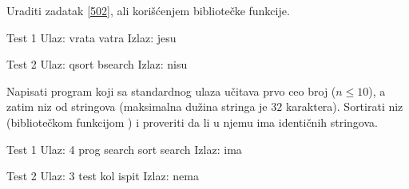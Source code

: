 \begin{Exercise}[label=522]
  Uraditi zadatak \ref{502}, ali korišćenjem bibliotečke 
  funkcije.
  
\begin{minitest}
\begin{test}{Test 1}
Ulaz:   vrata vatra
Izlaz:  jesu
\end{test}
\end{minitest}
\begin{miditest}
\begin{test}{Test 2}
Ulaz:   qsort bsearch
Izlaz:  nisu
\end{test}
\end{miditest}
  
\end{Exercise}

\begin{Exercise}[label=523]
  Napisati program koji sa standardnog ulaza učitava prvo ceo broj
   ($n \leq 10$), a zatim niz  od  stringova
  (maksimalna dužina stringa je $32$ karaktera). Sortirati niz
   (bibliotečkom funkcijom ) i proveriti da li u
  njemu ima identičnih stringova.
  
\begin{miditest}
\begin{test}{Test 1}
Ulaz:   4 prog search sort search
Izlaz:  ima
\end{test}
\end{miditest}
\begin{miditest}
\begin{test}{Test 2}
Ulaz:   3 test kol ispit
Izlaz:  nema
\end{test}
\end{miditest}
  
\end{Exercise}

